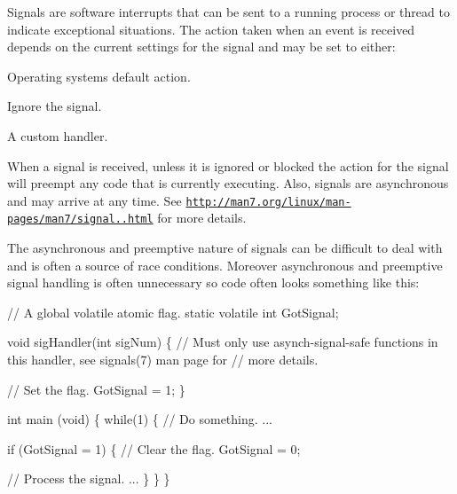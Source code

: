 Signals are software interrupts that can be sent to a running process or thread to indicate exceptional situations. The action taken when an event is received depends on the current settings for the signal and may be set to either\+:


\begin{DoxyItemize}
\item Operating systems default action.
\item Ignore the signal.
\item A custom handler.
\end{DoxyItemize}

When a signal is received, unless it is ignored or blocked the action for the signal will preempt any code that is currently executing. Also, signals are asynchronous and may arrive at any time. See \href{http://man7.org/linux/man-pages/man7/signal.7.html}{\tt http\+://man7.\+org/linux/man-\/pages/man7/signal..\+html} for more details.

The asynchronous and preemptive nature of signals can be difficult to deal with and is often a source of race conditions. Moreover asynchronous and preemptive signal handling is often unnecessary so code often looks something like this\+:


\begin{DoxyCode}
\textcolor{comment}{// A global volatile atomic flag.}
\textcolor{keyword}{static} \textcolor{keyword}{volatile} \textcolor{keywordtype}{int} GotSignal;

\textcolor{keywordtype}{void} sigHandler(\textcolor{keywordtype}{int} sigNum)
\{
     \textcolor{comment}{// Must only use asynch-signal-safe functions in this handler, see signals(7) man page for}
     \textcolor{comment}{// more details.}

     \textcolor{comment}{// Set the flag.}
     GotSignal = 1;
\}

\textcolor{keywordtype}{int} main (\textcolor{keywordtype}{void})
\{
     \textcolor{keywordflow}{while}(1)
     \{
         \textcolor{comment}{// Do something.}
         ...

         \textcolor{keywordflow}{if} (GotSignal = 1)
         \{
             \textcolor{comment}{// Clear the flag.}
             GotSignal = 0;

             \textcolor{comment}{// Process the signal.}
             ...
         \}
     \}
\}
\end{DoxyCode}


